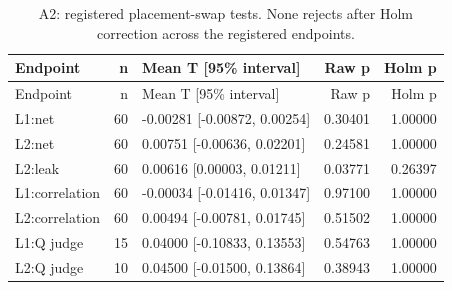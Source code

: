 \begingroup\footnotesize\setlength{\tabcolsep}{3pt}
\begin{longtable}{@{}lrlrr@{}}
\caption{A2: registered placement-swap tests. None rejects after Holm correction across the registered endpoints.}\\
\toprule Endpoint & n & Mean T [95\% interval] & Raw p & Holm p\\\midrule\endfirsthead
\toprule Endpoint & n & Mean T [95\% interval] & Raw p & Holm p\\\midrule\endhead
\bottomrule\endfoot
L1:net & 60 & -0.00281 [-0.00872, 0.00254] & 0.30401 & 1.00000\\
L2:net & 60 & 0.00751 [-0.00636, 0.02201] & 0.24581 & 1.00000\\
L2:leak & 60 & 0.00616 [0.00003, 0.01211] & 0.03771 & 0.26397\\
L1:correlation & 60 & -0.00034 [-0.01416, 0.01347] & 0.97100 & 1.00000\\
L2:correlation & 60 & 0.00494 [-0.00781, 0.01745] & 0.51502 & 1.00000\\
L1:Q judge & 15 & 0.04000 [-0.10833, 0.13553] & 0.54763 & 1.00000\\
L2:Q judge & 10 & 0.04500 [-0.01500, 0.13864] & 0.38943 & 1.00000\\
\end{longtable}\endgroup
\begingroup\footnotesize\setlength{\tabcolsep}{3pt}
